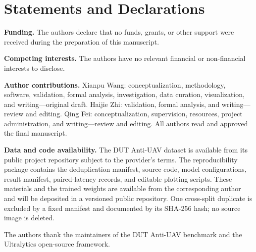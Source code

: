 \section*{Statements and Declarations}

\noindent\textbf{Funding.} The authors declare that no funds, grants, or other support were received during the preparation of this manuscript.

\noindent\textbf{Competing interests.} The authors have no relevant financial or non-financial interests to disclose.

\noindent\textbf{Author contributions.} Xianpu Wang: conceptualization, methodology, software, validation, formal analysis, investigation, data curation, visualization, and writing---original draft. Haijie Zhi: validation, formal analysis, and writing---review and editing. Qing Fei: conceptualization, supervision, resources, project administration, and writing---review and editing. All authors read and approved the final manuscript.

\noindent\textbf{Data and code availability.} The DUT Anti-UAV dataset is available from its public project repository subject to the provider's terms. The reproducibility package contains the deduplication manifest, source code, model configurations, result manifest, paired-latency records, and editable plotting scripts. These materials and the trained weights are available from the corresponding author and will be deposited in a versioned public repository. One cross-split duplicate is excluded by a fixed manifest and documented by its SHA-256 hash; no source image is deleted.

\begin{acknowledgements}
The authors thank the maintainers of the DUT Anti-UAV benchmark and the Ultralytics open-source framework.
\end{acknowledgements}
